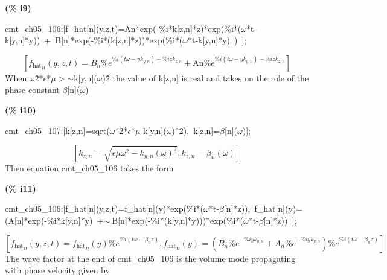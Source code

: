 \documentclass[fleqn]{article}
\begin{document}
\noindent
\begin{minipage}[t]{4.000000em}\color{red}\bfseries
(\% i9)	
\end{minipage}
\begin{minipage}[t]{\textwidth}\color{blue}
cmt\_ch05\_106:[f\_hat[n](y,z,t)=An*exp(-\%i*k[z,n]*z)*exp(\%i*(\ensuremath{\omega}*t-k[y,n]*y))\ +\ B[n]*exp(-\%i*(k[z,n]*z))*exp(\%i*(\ensuremath{\omega}*t-k[y,n]*y)\ )\ ];
\end{minipage}
\[\displaystyle \tag{\% o9} 
\left[ {{{f_{\ensuremath{\mathrm{hat}}}}}_n}\left( y\operatorname{,}z\operatorname{,}t\right) ={B_n} {{\% e}^{\% i \left( t \omega -y {k_{y,n}}\right) -\% i z {k_{z,n}}}}+\ensuremath{\mathrm{An}} {{\% e}^{\% i \left( t \omega -y {k_{y,n}}\right) -\% i z {k_{z,n}}}}\right] \mbox{}
\]
When \ensuremath{\omega}\^ 2*\ensuremath{\epsilon}*\ensuremath{\mu}\ensuremath{>}\ensuremath{\sim }k[y,n](\ensuremath{\omega})\^ 2 the value of k[z,n] is real and takes on the role of the phase constant \ensuremath{\beta}[n](\ensuremath{\omega})


\noindent
\begin{minipage}[t]{4.000000em}\color{red}\bfseries
(\% i10)	
\end{minipage}
\begin{minipage}[t]{\textwidth}\color{blue}
cmt\_ch05\_107:[k[z,n]=sqrt(\ensuremath{\omega}\^\ 2*\ensuremath{\epsilon}*\ensuremath{\mu}-k[y,n](\ensuremath{\omega})\^\ 2),\ k[z,n]=\ensuremath{\beta}[n](\ensuremath{\omega})];
\end{minipage}
\[\displaystyle \tag{\% o10} 
\left[ {k_{z,n}}=\sqrt{\epsilon  \mu  {{\omega }^{2}}-{{{k_{y,n}}\left( \omega \right) }^{2}}}\operatorname{,}{k_{z,n}}={{\beta }_n}\left( \omega \right) \right] \mbox{}
\]
Then equation cmt\_ch05\_106 takes the form


\noindent
\begin{minipage}[t]{4.000000em}\color{red}\bfseries
(\% i11)	
\end{minipage}
\begin{minipage}[t]{\textwidth}\color{blue}
cmt\_ch05\_106:[f\_hat[n](y,z,t)=f\_hat[n](y)*exp(\%i*(\ensuremath{\omega}*t-\ensuremath{\beta}[n]*z)),\ f\_hat[n](y)=(A[n]*exp(-\%i*k[y,n]*y)\ +\ensuremath{\sim\ }B[n]*exp(-\%i*(k[y,n]*y)))*exp(\%i*(\ensuremath{\omega}*t-\ensuremath{\beta}[n]*z))\ ];
\end{minipage}
\[\displaystyle \tag{\% o11} 
\operatorname{[}{{{f_{\ensuremath{\mathrm{hat}}}}}_n}\left( y\operatorname{,}z\operatorname{,}t\right) ={{{f_{\ensuremath{\mathrm{hat}}}}}_n}(y) {{\% e}^{\% i \left( t \omega -{{\beta }_n} z\right) }}\operatorname{,}{{{f_{\ensuremath{\mathrm{hat}}}}}_n}(y)=\left( {B_n} {{\% e}^{-\% i y {k_{y,n}}}}+{A_n} {{\% e}^{-\% i y {k_{y,n}}}}\right) {{\% e}^{\% i \left( t \omega -{{\beta }_n} z\right) }}\operatorname{]}\mbox{}
\]
The wave factor at the end of cmt\_ch05\_106 is the volume mode propagating with phase velocity given by
\end{document}
